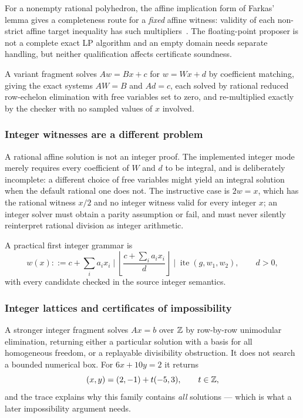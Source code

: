 For a nonempty rational polyhedron, the affine implication form of Farkas'
lemma gives a completeness route for a \emph{fixed} affine witness: validity of
each non-strict affine target inequality has such
multipliers~\cite{mosek-cookbook}. The floating-point proposer is not a complete
exact LP algorithm and an empty domain needs separate handling, but neither
qualification affects certificate soundness.

A variant fragment solves $A w=Bx+c$ for $w=Wx+d$ by coefficient matching,
giving the exact systems $AW=B$ and $Ad=c$, each solved by rational reduced
row-echelon elimination with free variables set to zero, and re-multiplied
exactly by the checker with no sampled values of $x$ involved.

\subsubsection*{Integer witnesses are a different problem}

A rational affine solution is not an integer proof. The implemented integer mode
merely requires every coefficient of $W$ and $d$ to be integral, and is
deliberately incomplete: a different choice of free variables might yield an
integral solution when the default rational one does not. The instructive case
is $2w=x$, which has the rational witness $x/2$ and no integer witness valid for
every integer $x$; an integer solver must obtain a parity assumption or fail,
and must never silently reinterpret rational division as integer arithmetic.

A practical first integer grammar is
\[
 w(x) ::= c+\sum_i a_ix_i\;\Big|\;
 \left\lfloor\frac{c+\sum_i a_ix_i}{d}\right\rfloor\;\Big|\;
 \operatorname{ite}(g,w_1,w_2),\qquad d>0,
\]
with every candidate checked in the source integer semantics.

\subsubsection*{Integer lattices and certificates of impossibility}

A stronger integer fragment solves $Ax=b$ over $\mathbb{Z}$ by row-by-row unimodular
elimination, returning either a particular solution with a basis for all
homogeneous freedom, or a replayable divisibility obstruction. It does not
search a bounded numerical box. For $6x+10y=2$ it returns
\[
(x,y)=(2,-1)+t(-5,3),\qquad t\in\mathbb{Z},
\]
and the trace explains why this family contains \emph{all} solutions --- which
is what a later impossibility argument needs.

